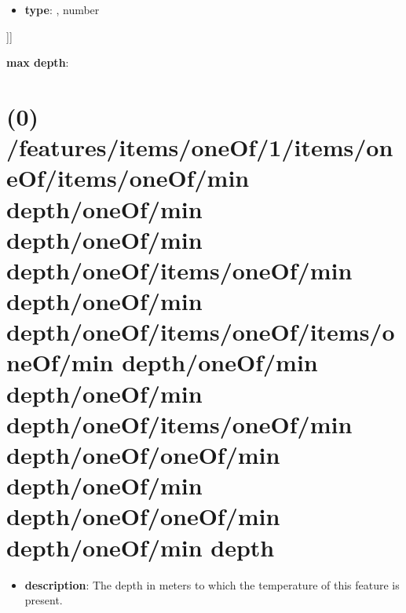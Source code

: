 \begin{itemize}[leftmargin=5em]\item {\bf type}: , number\end{itemize}]]\item {\bf max depth}: \section{(0) /features/items/oneOf/1/items/oneOf/items/oneOf/min depth/oneOf/min depth/oneOf/min depth/oneOf/items/oneOf/min depth/oneOf/min depth/oneOf/items/oneOf/items/oneOf/min depth/oneOf/min depth/oneOf/min depth/oneOf/items/oneOf/min depth/oneOf/oneOf/min depth/oneOf/min depth/oneOf/oneOf/min depth/oneOf/min depth}
\begin{itemize}[leftmargin=0em]\item {\bf description}: The depth in meters to which the temperature of this feature is present.
\end{itemize}

